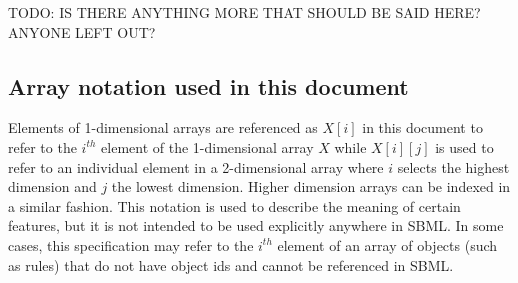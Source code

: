 TODO: IS THERE ANYTHING MORE THAT SHOULD BE SAID HERE?  ANYONE LEFT OUT?

\subsection{Array notation used in this document}

Elements of 1-dimensional arrays are referenced as $X[i]$ in this document to refer to the  $i^{th}$ element of the 1-dimensional array $X$ while $X[i][j]$ is used to refer to an individual element in a 2-dimensional array where $i$ selects the highest dimension and $j$ the lowest dimension.
Higher dimension arrays can be indexed in a similar fashion.
This notation is used to describe the meaning of certain features, but it is not intended to be used explicitly anywhere in SBML. 
In some cases, this specification may refer to the $i^{th}$ element of an array of objects (such as rules) that do not have object ids and cannot be referenced in SBML. 



